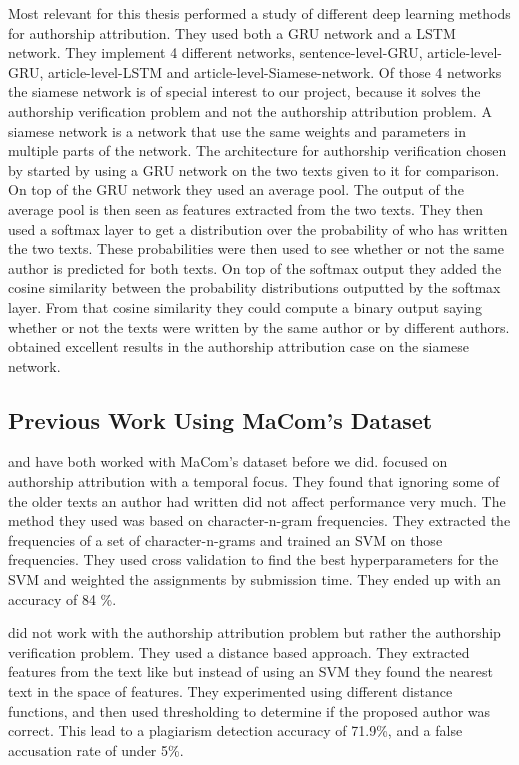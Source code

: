Most relevant for this thesis \citet{qian:2018} performed a study of different
deep learning methods for authorship attribution. They used both a \gls{GRU}
network and a \gls{LSTM} network. They implement 4 different networks,
sentence-level-\gls{GRU}, article-level-\gls{GRU}, article-level-\gls{LSTM}
and article-level-Siamese-network. Of those 4 networks the siamese network
is of special interest to our project, because it solves the authorship
verification problem and not the authorship attribution problem. A siamese
network is a network that use the same weights and parameters in multiple
parts of the network. The architecture for authorship verification chosen by
\citet{qian:2018} started by using a \gls{GRU} network on the two texts given
to it for comparison. On top of the \gls{GRU} network they used an average
pool. The output of the average pool is then seen as features extracted from
the two texts. They then used a softmax layer to get a distribution over the
probability of who has written the two texts. These probabilities were then used
to see whether or not the same author is predicted for both texts. On top of
the softmax output they added the cosine similarity between the probability
distributions outputted by the softmax layer. From that cosine similarity they
could compute a binary output saying whether or not the texts were written by the same
author or by different authors. \citet{qian:2018} obtained excellent results in
the authorship attribution case on the siamese network.


\subsection{Previous Work Using MaCom's Dataset}
\label{subsec:previous_work_using_macoms_dataset}

\citet{hansen2014} and \citet{aalykke2016} have both worked with MaCom's dataset
before we did. \citet{hansen2014} focused on authorship attribution with a
temporal focus. They found that ignoring some of the older texts an author had
written did not affect performance very much. The method they used was based
on character-n-gram frequencies. They extracted the frequencies of a set of
character-n-grams and trained an \gls{SVM} on those frequencies. They used cross
validation to find the best hyperparameters for the \gls{SVM} and weighted the
assignments by submission time. They ended up with an accuracy of 84 \%.

\citet{aalykke2016} did not work with the authorship attribution problem but
rather the authorship verification problem. They used a distance based approach.
They extracted features from the text like \citet{hansen2014} but instead of
using an \gls{SVM} they found the nearest text in the space of features. They
experimented using different distance functions, and then used thresholding
to determine if the proposed author was correct. This lead to a plagiarism
detection accuracy of 71.9\%, and a false accusation rate of under 5\%.

